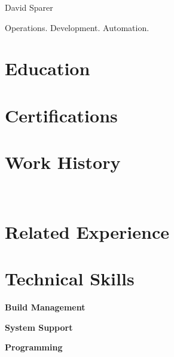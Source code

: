 \documentclass{cls/res}
\begin{document}
	\thispagestyle{empty} %

	\begin{resume}
		\vspace{-0.5in}
		\begin{minipage}[c]{0.78\textwidth}
			\centerline{{\Huge David Sparer}}
			\vspace{.2in}
			\centerline{Operations. Development. Automation.}
		\end{minipage}
		\begin{minipage}[c]{0.25\textwidth}
			
		\end{minipage}

		\section{Education}
			\vspace{0.1in}
			

		\section{Certifications}
			\vspace{0.1in}
			

		\section{Work History}
			\vspace{0.1in}
			
			
			
			
			
			\\ %
			

		\section{Related Experience}
			\vspace{0.1in}
			

		\section{Technical Skills}
			\vspace{0.1in}
			{\bf Build Management}
				\vspace{-0.1in}
				
			\vspace{-0.1in}
			{\bf System Support}
				\vspace{-0.1in}
				
			\vspace{-0.1in}
			{\bf Programming}
				\vspace{-0.1in}
				

	\end{resume}
\end{document}
